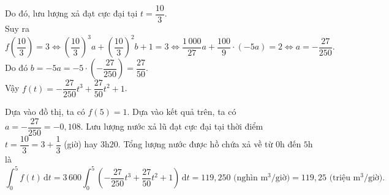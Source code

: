 \begin{ex}
{		Do đó, lưu  lượng xả đạt cực đại tại $t = \dfrac{10}{3}$.\\
		Suy ra 
		$$ f\left(\dfrac{10}{3}\right) = 3 \Leftrightarrow \left(\dfrac{10}{3}\right)^3a + \left(\dfrac{10}{3}\right)^2b + 1 = 3 \Leftrightarrow \dfrac{1\,000}{27}a  + \dfrac{100}{9}\cdot (-5a) = 2 \Leftrightarrow a = -\dfrac{27}{250}.$$
		Do đó  $b = -5a = -5\cdot \left(-\dfrac{27}{250}\right) = \dfrac{27}{50}$.\\
		Vậy $f(t) = -\dfrac{27}{250}t^3  + \dfrac{27}{50}t^2 + 1$.
		\begin{itemchoice}
			\itemch Dựa vào đồ thị, ta có  $f(5) = 1$.
			 \itemch Dựa vào kết quả trên, ta có $a = -\dfrac{27}{250} = -0{,}108$.
			\itemch Lưu lượng nước xả lũ đạt cực đại tại thời điểm $t =  \dfrac{10}{3} = 3 + \dfrac{1}{3}$ (giờ) hay $3$h$20$.
			 \itemch Tổng lượng nước được hồ chứa xả về từ $0$h đến $5$h là
			\[\displaystyle\int_0^5 f(t)\mathrm{\,d}t = 3\,600\displaystyle\int_0^5\left(-\dfrac{27}{250}t^3 + \dfrac{27}{50}t^2 + 1\right) \mathrm{\,d}t = 119{,}250  \text{ (nghìn m$^3$/giờ)} = 119{,}25 \text{ (triệu m$^3$/giờ)}.\]
		\end{itemchoice}
	} 
\end{ex}

